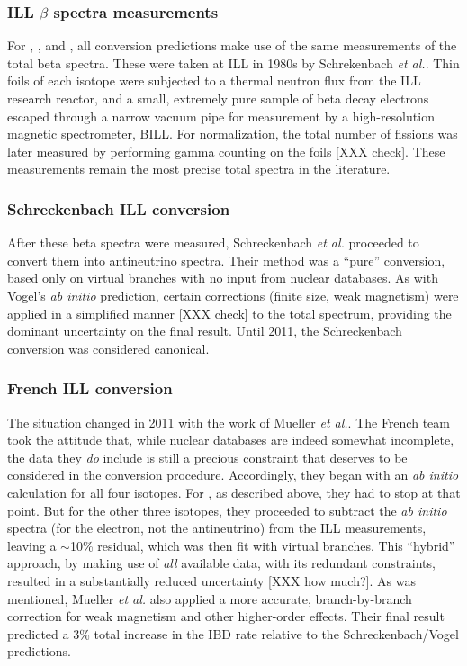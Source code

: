 \documentclass[../thesis.tex]{subfiles}
\begin{document}
\subsubsection{ILL $\beta$ spectra measurements}
\label{sec:illmeas}

For \urfive, \punine, and \puone, all conversion predictions make use of the same measurements of the total beta spectra. These were taken at ILL in 1980s by Schrekenbach \emph{et al.}. Thin foils of each isotope were subjected to a thermal neutron flux from the ILL research reactor, and a small, extremely pure sample of beta decay electrons escaped through a narrow vacuum pipe for measurement by a high-resolution magnetic spectrometer, BILL. For normalization, the total number of fissions was later measured by performing gamma counting on the foils [XXX check]. These measurements remain the most precise total spectra in the literature.

\subsubsection{Schreckenbach ILL conversion}
\label{sec:schreck}

After these beta spectra were measured, Schreckenbach \emph{et al.} proceeded to convert them into antineutrino spectra. Their method was a ``pure'' conversion, based only on virtual branches with no input from nuclear databases. As with Vogel's \ureight \emph{ab initio} prediction, certain corrections (finite size, weak magnetism) were applied in a simplified manner [XXX check] to the total spectrum, providing the dominant uncertainty on the final result. Until 2011, the Schreckenbach conversion was considered canonical.

\subsubsection{French ILL conversion}
\label{sec:frenchconv}

The situation changed in 2011 with the work of Mueller \emph{et al.}. The French team took the attitude that, while nuclear databases are indeed somewhat incomplete, the data they \emph{do} include is still a precious constraint that deserves to be considered in the conversion procedure. Accordingly, they began with an \emph{ab initio} calculation for all four isotopes. For \ureight, as described above, they had to stop at that point. But for the other three isotopes, they proceeded to subtract the \emph{ab initio} spectra (for the electron, not the antineutrino) from the ILL measurements, leaving a $\sim$10\% residual, which was then fit with virtual branches. This ``hybrid'' approach, by making use of \emph{all} available data, with its redundant constraints, resulted in a substantially reduced uncertainty [XXX how much?]. As was mentioned, Mueller \emph{et al.} also applied a more accurate, branch-by-branch correction for weak magnetism and other higher-order effects. Their final result predicted a 3\% total increase in the IBD rate relative to the Schreckenbach/Vogel predictions.
\end{document}
